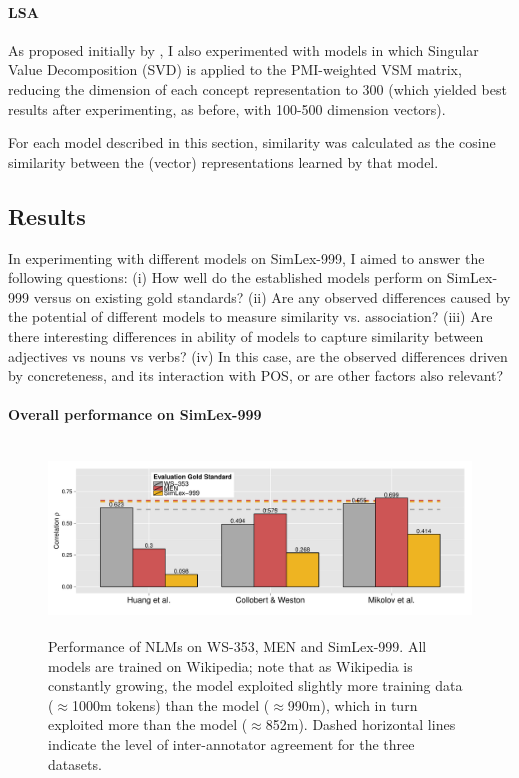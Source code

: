 \paragraph{\bf LSA} As proposed initially by \cite{landauer1997solution}, I also experimented with models in which Singular Value Decomposition (SVD) \citep{golub1970singular} is applied to the PMI-weighted VSM matrix, reducing the dimension of each concept representation to 300 (which yielded best results after experimenting, as before, with 100-500 dimension vectors). 

\vspace{1\baselineskip}

\noindent 
For each model described in this section, similarity was calculated as the cosine similarity between the (vector) representations learned by that model. 

\subsection{Results}

In experimenting with different models on SimLex-999, I aimed to answer the following questions: (i) How well do the established models perform on SimLex-999 versus on existing gold standards? (ii) Are any observed differences caused by the potential of different models to measure similarity vs. association? (iii) Are there interesting differences in ability of models to capture similarity between adjectives vs nouns vs verbs? (iv) In this case, are the observed differences driven by concreteness, and its interaction with POS, or are other factors also relevant?

\paragraph{\bf Overall performance on SimLex-999}
\label{assoc}

\begin{figure}[ht]  \includegraphics[width = \textwidth, height=5cm]{Chapter_2/Figure_2A_CL} \caption{\label{fig7}Performance of NLMs on WS-353, MEN and SimLex-999. All models are trained on Wikipedia; note that as Wikipedia is constantly growing, the \protect\cite{mikolov2013efficient} model exploited slightly more training data ($\approx$1000m tokens) than the \protect\cite{huang2012improving} model ($\approx$990m), which in turn exploited more than the \protect\cite{collobert2008unified} model ($\approx$852m). Dashed horizontal lines indicate the level of inter-annotator agreement for the three datasets.}\end{figure}

